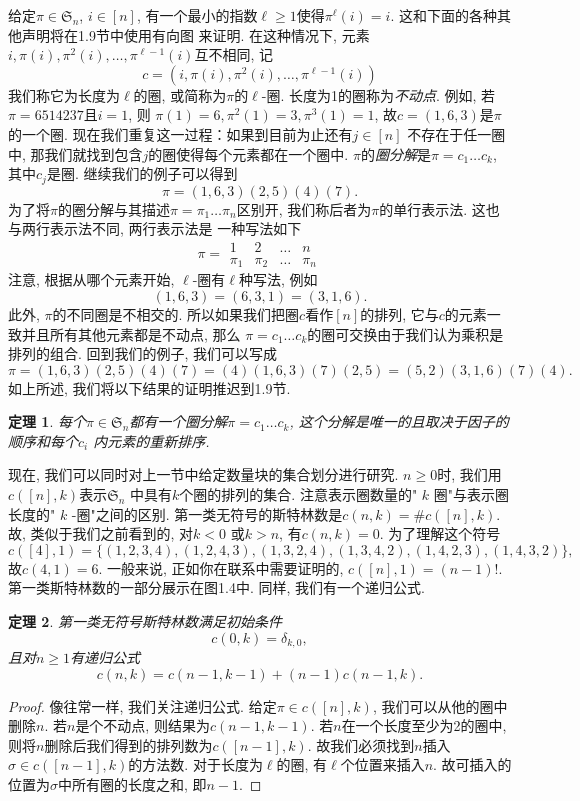 \documentclass{ctexbook}
\newtheorem{thm}{定理}[section]
\begin{document}
给定$\pi \in \mathfrak{S}_{n}$, $i \in[n]$, 有一个最小的指数$\ell \geqslant 1$使得$\pi^{\ell}(i)=i$. 这和下面的各种其他声明将在1.9节中使用有向图
来证明. 在这种情况下, 元素$i, \pi(i), \pi^{2}(i), \ldots, \pi^{\ell-1}(i)$互不相同, 记
$$
c=\left(i, \pi(i), \pi^{2}(i), \ldots, \pi^{\ell-1}(i)\right)
$$
我们称它为长度为$\ell$的圈, 或简称为$\pi$的$\ell$-圈. 长度为1的圈称为\textsl{不动点}. 例如, 若$\pi=6514237$且$i=1$, 则
$\pi(1)=6, \pi^{2}(1)=3, \pi^{3}(1)=1$, 故$c=(1,6,3)$是$\pi$的一个圈. 现在我们重复这一过程：如果到目前为止还有$j \in[n]$
不存在于任一圈中, 那我们就找到包含$j$的圈使得每个元素都在一个圈中. $\pi$的\textsl{圈分解}是$\pi=c_{1} \ldots c_{k}$,
其中$c_{j}$是圈. 继续我们的例子可以得到
$$
\pi=(1,6,3)(2,5)(4)(7).
$$
为了将$\pi$的圈分解与其描述$\pi=\pi_{1} \ldots \pi_{n}$区别开, 我们称后者为$\pi$的单行表示法. 这也与两行表示法不同, 两行表示法是
一种写法如下
\begin{equation}
\pi=\begin{array}{cccc}
1 & 2 & \ldots & n \\
\pi_{1} & \pi_{2} & \ldots & \pi_{n}
\end{array}
\end{equation}
注意, 根据从哪个元素开始, $\ell$-圈有$\ell$种写法, 例如
$$
(1,6,3)=(6,3,1)=(3,1,6).
$$
此外, $\pi$的不同圈是不相交的. 所以如果我们把圈$c$看作$[n]$的排列, 它与$c$的元素一致并且所有其他元素都是不动点, 那么
$\pi=c_{1} \ldots c_{k}$的圈可交换由于我们认为乘积是排列的组合. 回到我们的例子, 我们可以写成
$$
\pi=(1,6,3)(2,5)(4)(7)=(4)(1,6,3)(7)(2,5)=(5,2)(3,1,6)(7)(4).
$$
如上所述, 我们将以下结果的证明推迟到1.9节.
  \begin{thm}
  	每个$\pi \in \mathfrak{S}_{n}$都有一个圈分解$\pi=c_{1} \ldots c_{k}$, 这个分解是唯一的且取决于因子的顺序和每个$c_{i}$
  	内元素的重新排序.
  \end{thm}
现在, 我们可以同时对上一节中给定数量块的集合划分进行研究. $n \geqslant 0$时, 我们用$c([n], k)$表示$\mathfrak{S}_{n}$
中具有$k$个圈的排列的集合. 注意表示圈数量的" $k$ 圈"与表示圈长度的" $k$ -圈"之间的区别. 第一类无符号的斯特林数是$c(n, k)=\# c([n], k)$.
故, 类似于我们之前看到的, 对$k<0$ 或$k>n$, 有$c(n, k)=0$. 为了理解这个符号
$$
c([4], 1)=\{(1,2,3,4),(1,2,4,3),(1,3,2,4),(1,3,4,2),(1,4,2,3),(1,4,3,2)\},
$$
故$c(4,1)=6$. 一般来说, 正如你在联系中需要证明的, $c([n], 1)=(n-1) !$. 第一类斯特林数的一部分展示在图1.4中. 同样, 我们有一个递归公式.
    \begin{thm}
    	第一类无符号斯特林数满足初始条件
    	$$
    	c(0, k)=\delta_{k, 0},
    	$$
    	且对$n \geqslant 1$有递归公式
    	$$
    	c(n, k)=c(n-1, k-1)+(n-1) c(n-1, k).
    	$$
    \end{thm}
    \begin{proof}
    	像往常一样, 我们关注递归公式. 给定$\pi \in c([n], k)$, 我们可以从他的圈中删除$n$. 若$n$是个不动点, 则结果为$c(n-1, k-1)$.
    	若$n$在一个长度至少为2的圈中, 则将$n$删除后我们得到的排列数为$c([n-1], k)$. 故我们必须找到$n$插入$\sigma \in c([n-1], k)$的方法数.
    	对于长度为$\ell$的圈, 有$\ell$个位置来插入$n$. 故可插入的位置为$\sigma$中所有圈的长度之和, 即$n-1$.
    \end{proof}
\end{document}
